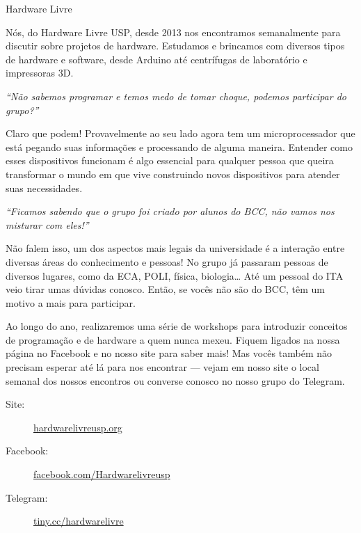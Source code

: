\begin{subsecao}{Hardware Livre}


Nós, do Hardware Livre USP, desde 2013 nos encontramos semanalmente para
discutir sobre projetos de hardware. Estudamos e brincamos com diversos tipos de
hardware e software, desde Arduino até centrífugas de laboratório e impressoras
3D.

\textit{``Não sabemos programar e temos medo de tomar choque, podemos participar
do grupo?''}

Claro que podem! Provavelmente ao seu lado agora tem um microprocessador que
está pegando suas informações e processando de alguma maneira. Entender como
esses dispositivos funcionam é algo essencial para qualquer pessoa que queira
transformar o mundo em que vive construindo novos dispositivos para atender
suas necessidades.

\textit{``Ficamos sabendo que o grupo foi criado por alunos do BCC, não vamos
nos misturar com eles!''}

Não falem isso, um dos aspectos mais legais da universidade é a interação entre
diversas áreas do conhecimento e pessoas! No grupo já passaram pessoas de
diversos lugares, como da ECA, POLI, física, biologia… Até um pessoal do ITA
veio tirar umas dúvidas conosco. Então, se vocês não são do BCC, têm um motivo a
mais para participar.

Ao longo do ano, realizaremos uma série de workshops para introduzir conceitos 
de programação e de hardware a quem nunca mexeu. Fiquem ligados na nossa página 
no Facebook e no nosso site para saber mais! Mas vocês também não precisam 
esperar até lá para nos encontrar — vejam em nosso site o local semanal dos 
nossos encontros ou converse conosco no nosso grupo do Telegram.

\begin{description}
  \item[Site:] \url{hardwarelivreusp.org}
  \item[Facebook:] \url{facebook.com/Hardwarelivreusp}
  \item[Telegram:] \url{tiny.cc/hardwarelivre}
\end{description}

\end{subsecao}
